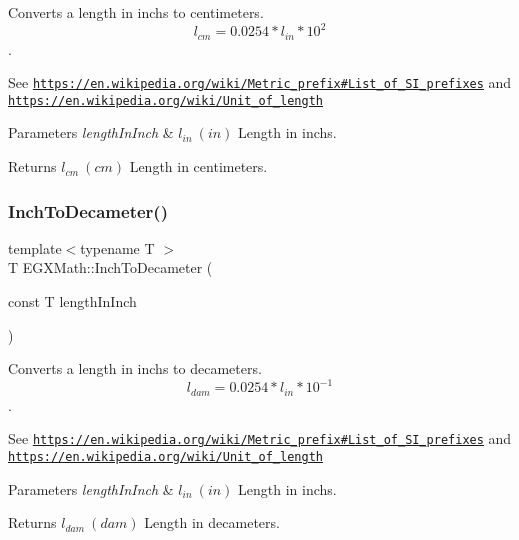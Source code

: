 Converts a length in inchs to centimeters. \[ l_{cm}=0.0254 * l_{in} * 10^{2} \]. 

See \href{https://en.wikipedia.org/wiki/Metric_prefix#List_of_SI_prefixes}{\tt https\+://en.\+wikipedia.\+org/wiki/\+Metric\+\_\+prefix\#\+List\+\_\+of\+\_\+\+S\+I\+\_\+prefixes} and \href{https://en.wikipedia.org/wiki/Unit_of_length}{\tt https\+://en.\+wikipedia.\+org/wiki/\+Unit\+\_\+of\+\_\+length} 
\begin{DoxyParams}{Parameters}
{\em length\+In\+Inch} & $ l_{in}\ (in)$ Length in inchs. \\
\hline
\end{DoxyParams}
\begin{DoxyReturn}{Returns}
$ l_{cm}\ (cm)$ Length in centimeters. 
\end{DoxyReturn}
\mbox{\label{group___e_g_x_math-_conversions-_length_conversions-_imperial-_inch-_s_i_ga84fad3dadf96d1f96530fb0e5fe8fca1}} 
\subsubsection{\texorpdfstring{Inch\+To\+Decameter()}{InchToDecameter()}}
{\footnotesize\ttfamily template$<$typename T $>$ \\
T E\+G\+X\+Math\+::\+Inch\+To\+Decameter (\begin{DoxyParamCaption}\item[{const T}]{length\+In\+Inch }\end{DoxyParamCaption})}



Converts a length in inchs to decameters. \[ l_{dam}=0.0254 * l_{in} * 10^{-1} \]. 

See \href{https://en.wikipedia.org/wiki/Metric_prefix#List_of_SI_prefixes}{\tt https\+://en.\+wikipedia.\+org/wiki/\+Metric\+\_\+prefix\#\+List\+\_\+of\+\_\+\+S\+I\+\_\+prefixes} and \href{https://en.wikipedia.org/wiki/Unit_of_length}{\tt https\+://en.\+wikipedia.\+org/wiki/\+Unit\+\_\+of\+\_\+length} 
\begin{DoxyParams}{Parameters}
{\em length\+In\+Inch} & $ l_{in}\ (in)$ Length in inchs. \\
\hline
\end{DoxyParams}
\begin{DoxyReturn}{Returns}
$ l_{dam}\ (dam)$ Length in decameters. 
\end{DoxyReturn}
\mbox{\label{group___e_g_x_math-_conversions-_length_conversions-_imperial-_inch-_s_i_ga8a9bfe2e6e472e66f92146b5b867264b}} 
